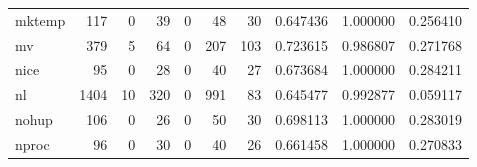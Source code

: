 \begin{tabular}{lrrrrrrrrr}
mktemp    &                                                117 &                                                  0 &                                                 39 &                                                  0 &                                                 48 &                                                 30 &                                           0.647436 &                               1.000000 &                             0.256410 \\
mv        &                                                379 &                                                  5 &                                                 64 &                                                  0 &                                                207 &                                                103 &                                           0.723615 &                               0.986807 &                             0.271768 \\
nice      &                                                 95 &                                                  0 &                                                 28 &                                                  0 &                                                 40 &                                                 27 &                                           0.673684 &                               1.000000 &                             0.284211 \\
nl        &                                               1404 &                                                 10 &                                                320 &                                                  0 &                                                991 &                                                 83 &                                           0.645477 &                               0.992877 &                             0.059117 \\
nohup     &                                                106 &                                                  0 &                                                 26 &                                                  0 &                                                 50 &                                                 30 &                                           0.698113 &                               1.000000 &                             0.283019 \\
nproc     &                                                 96 &                                                  0 &                                                 30 &                                                  0 &                                                 40 &                                                 26 &                                           0.661458 &                               1.000000 &                             0.270833 \\

\end{tabular}
